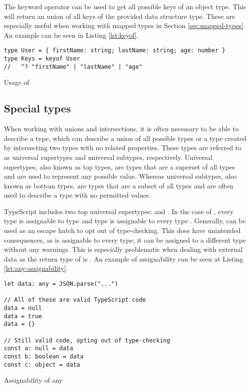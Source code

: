 The  keyword operator can be used to get all possible keys of an object type. This will return an union of all keys of the provided data structure type. These are especially useful when working with mapped types in Section \ref{sec:mapped-types}. An example can be seen in Listing \ref{lst:keyof}.

\begin{listing}[ht]
  \begin{verbatim}
type User = { firstName: string; lastName: string; age: number }
type Keys = keyof User
//   ^? "firstName" | "lastName" | "age"
\end{verbatim}
  \caption{Usage of }\label{lst:keyof}
\end{listing}

\subsection{Special types}

When working with unions and intersections, it is often necessary to be able to describe a type, which can describe a union of all possible types or a type created by intersecting two types with no related properties. These types are referred to as universal supertypes and universal subtypes, respectively. Universal supertypes, also known as top types, are types that are a superset of all types and are used to represent any possible value. Whereas universal subtypes, also known as bottom types, are types that are a subset of all types and are often used to describe a type with no permitted values.

TypeScript includes two top universal supertypes:  and . In the case of , every type is assignable to type  and type  is assignable to every type \cite{TopTypesAny}. Generally,  can be used as an escape hatch to opt out of type-checking. This does have unintended consequences, as  is assignable to every type; it can be assigned to a different type without any warnings. This is especially problematic when dealing with external data as the return type of  is . An example of assignability can be seen at Listing \ref{lst:any-assignability}.

\begin{listing}[ht]
  \begin{verbatim}
let data: any = JSON.parse("...") 

// All of these are valid TypeScript code
data = null
data = true
data = {}

// Still valid code, opting out of type-checking
const a: null = data
const b: boolean = data
const c: object = data
  \end{verbatim}
  \caption{Assignability of any}\label{lst:any-assignability}
\end{listing}

